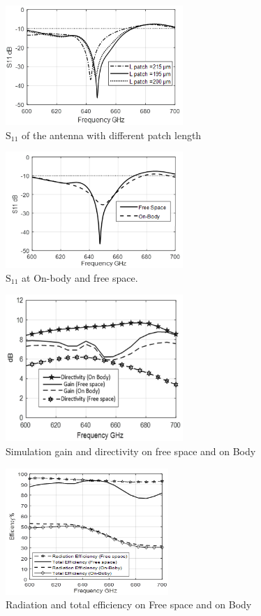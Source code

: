 \documentclass[12pt]{suhbook}
\begin{document}
% 
\begin{figure}[hbt!]
    \centering
    \includegraphics[width=0.6\textwidth]{9}
    \caption{$\mathrm{S_{11}}$ of the antenna with different patch length}
    \label{Fig 8AE}
\end{figure}
\begin{figure}[hbt!]
    \centering
    \includegraphics[width=0.6\textwidth]{10}
    \caption{$\mathrm{S_{11}}$ at On-body and free space.}
    \label{Fig 8B}
\end{figure}
\begin{figure}[hbt!]
    \centering
    \includegraphics[width=0.6\textwidth]{11}
    \caption{Simulation gain and directivity on free space and on Body}
    \label{Fig 8AA}
\end{figure}
\begin{figure}[hbt!]
    \centering
    \includegraphics[width=0.55\textwidth]{12}
    \caption{Radiation and total efficiency on Free space and on Body}
    \label{Fig 91}
\end{figure}
\end{document}
